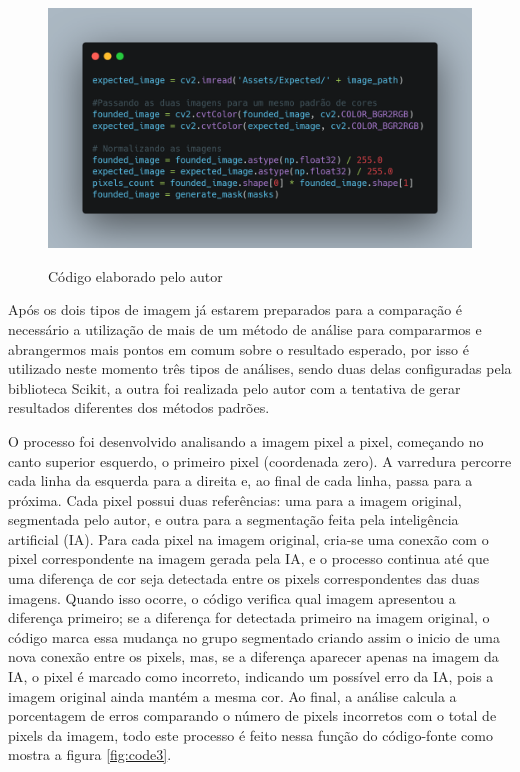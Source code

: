 \FloatBarrier
\begin{figure}[ht]
    \caption{Código elaborado pelo autor}
    \centering
    \includegraphics[scale=0.25]{imagens/code_part_two.png}
    \label{fig:code2}
\end{figure}
\FloatBarrier

Após os dois tipos de imagem já estarem preparados para a comparação é necessário a utilização de mais de um método de análise para compararmos e abrangermos mais pontos em comum sobre o resultado esperado, por isso é utilizado neste momento três tipos de análises, sendo duas delas configuradas pela biblioteca Scikit, a outra foi realizada pelo autor com a tentativa de gerar resultados diferentes dos métodos padrões.

O processo foi desenvolvido analisando a imagem pixel a pixel, começando no canto superior esquerdo, o primeiro pixel (coordenada zero). A varredura percorre cada linha da esquerda para a direita e, ao final de cada linha, passa para a próxima. Cada pixel possui duas referências: uma para a imagem original, segmentada pelo autor, e outra para a segmentação feita pela inteligência artificial (IA). Para cada pixel na imagem original, cria-se uma conexão com o pixel correspondente na imagem gerada pela IA, e o processo continua até que uma diferença de cor seja detectada entre os pixels correspondentes das duas imagens. Quando isso ocorre, o código verifica qual imagem apresentou a diferença primeiro; se a diferença for detectada primeiro na imagem original, o código marca essa mudança no grupo segmentado criando assim o inicio de uma nova conexão entre os pixels, mas, se a diferença aparecer apenas na imagem da IA, o pixel é marcado como incorreto, indicando um possível erro da IA, pois a imagem original ainda mantém a mesma cor. Ao final, a análise calcula a porcentagem de erros comparando o número de pixels incorretos com o total de pixels da imagem, todo este processo é feito nessa função do código-fonte como mostra a figura \ref{fig:code3}.

